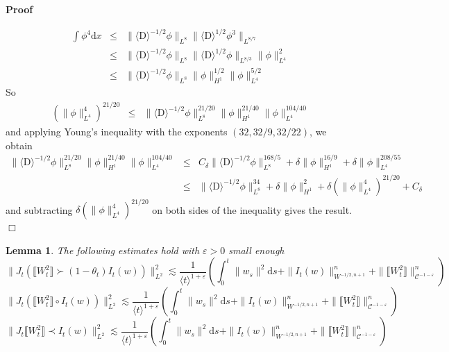 \documentclass[11pt]{article}
\newcommand{\mathD}{\mathrm{D}}
\newcommand{\mathd}{\mathrm{d}}
\newenvironment{proof}{\noindent\textbf{Proof\ }}{\hspace*{\fill}$\Box$\medskip}
\newtheorem{lemma}{Lemma}
\newcommand{\VV}{\mathscr{C}}
\begin{document}
\begin{proof}
  
  \begin{eqnarray*}
    \int \phi^4 \mathd x & \leqslant & \| \langle \mathD \rangle^{- 1 / 2}
    \phi \|_{L^8} \| \langle \mathD \rangle^{1 / 2} \phi^3 \|_{L^{8 / 7}}\\
    & \leqslant & \| \langle \mathD \rangle^{- 1 / 2} \phi \|_{L^8} \|
    \langle \mathD \rangle^{1 / 2} \phi \|_{L^{8 / 3}} \| \phi \|^2_{L^4}\\
    & \leqslant & \| \langle \mathD \rangle^{- 1 / 2} \phi \|_{L^8} \| \phi
    \|^{1 / 2}_{H^1} \| \phi \|^{5 / 2}_{L^4}
  \end{eqnarray*}
  So
  \begin{eqnarray*}
    (\| \phi \|^4_{L^4})^{21 / 20} & \leqslant & \| \langle \mathD \rangle^{-
    1 / 2} \phi \|^{21 / 20}_{L^8} \| \phi \|^{21 / 40}_{H^1} \| \phi \|^{104
    / 40}_{L^4}
  \end{eqnarray*}
  and applying Young's inequality with the exponents $(32, 32 / 9, 32 / 22)$,
  we obtain
  \[ \begin{array}{lll}
       \| \langle \mathD \rangle^{- 1 / 2} \phi \|^{21 / 20}_{L^8} \| \phi
       \|^{21 / 40}_{H^1} \| \phi \|^{104 / 40}_{L^4} & \leqslant & C_{\delta}
       \| \langle \mathD \rangle^{- 1 / 2} \phi \|^{168 / 5}_{L^8} + \delta \|
       \phi \|^{16 / 9}_{H^1} + \delta \| \phi \|^{208 / 55}_{L^4}\\
       & \leqslant & \| \langle \mathD \rangle^{- 1 / 2} \phi \|^{34}_{L^8} +
       \delta \| \phi \|^2_{H^1} + \delta (\| \phi \|^4_{L^4})^{21 / 20} +
       C_{\delta}
     \end{array} \]
  and subtracting $\delta (\| \phi \|^4_{L^4})^{21 / 20}$ on both sides of the
  inequality gives the result. 
\end{proof}

\begin{lemma}
  The following estimates hold with $\varepsilon > 0$ small
  enough\label{analyticestimate1}
  \[ \| J_t (\llbracket W_t^2 \rrbracket \succ (1 - \theta_t) I_t (w))
     \|^2_{L^2} \lesssim \frac{1}{\langle t \rangle^{1 + \varepsilon}} \left(
     \int^t_0 \| w_s \|^2 \mathd s + \| I_t (w) \|^n_{W^{- 1 / 2, n + 1}} + \|
     \llbracket W_t^2 \rrbracket \|^n_{\VV^{- 1 - \varepsilon}} \right) \]
  \[ \| J_t (\llbracket W_t^2 \rrbracket \circ I_t (w)) \|^2_{L^2} \lesssim
     \frac{1}{\langle t \rangle^{1 + \varepsilon}} \left( \int^t_0 \| w_s \|^2
     \mathd s + \| I_t (w) \|^n_{W^{- 1 / 2, n + 1}} + \| \llbracket W_t^2
     \rrbracket \|^n_{\VV^{- 1 - \varepsilon}} \right) \]
  \[ \| J_t \llbracket W_t^2 \rrbracket \prec I_t (w) \|^2_{L^2} \lesssim
     \frac{1}{\langle t \rangle^{1 + \varepsilon}} \left( \int^t_0 \| w_s \|^2
     \mathd s + \| I_t (w) \|^n_{W^{- 1 / 2, n + 1}} + \| \llbracket W_t^2
     \rrbracket \|^n_{\VV^{- 1 - \varepsilon}} \right) \]
\end{lemma}
\end{document}
